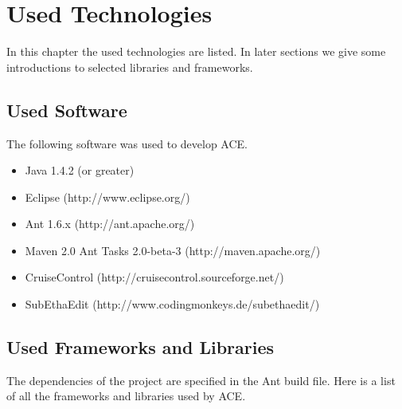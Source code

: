 \chapter{Used Technologies}

In this chapter the used technologies are listed. In later sections we give
some introductions to selected libraries and frameworks.


\section{Used Software}
The following software was used to develop ACE.
\begin{itemize}
 \item Java 1.4.2 (or greater)
 \item Eclipse (http://www.eclipse.org/)
 \item Ant 1.6.x (http://ant.apache.org/)
 \item Maven 2.0 Ant Tasks 2.0-beta-3 (http://maven.apache.org/)
 \item CruiseControl (http://cruisecontrol.sourceforge.net/)
 \item SubEthaEdit (http://www.codingmonkeys.de/subethaedit/)
\end{itemize}


\section{Used Frameworks and Libraries}
The dependencies of the project are specified in the Ant build file.
Here is a list of all the frameworks and libraries used by ACE.


